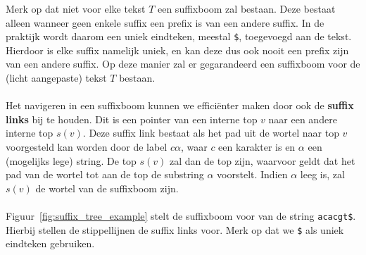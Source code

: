 Merk op dat niet voor elke tekst $T$ een suffixboom zal bestaan.
Deze bestaat alleen wanneer geen enkele suffix een prefix is van een andere suffix.
In de praktijk wordt daarom een uniek eindteken, meestal \texttt{\$}, toegevoegd aan de tekst.
Hierdoor is elke suffix namelijk uniek, en kan deze dus ook nooit een prefix zijn van een andere suffix.
Op deze manier zal er gegarandeerd een suffixboom voor de (licht aangepaste) tekst $T$ bestaan.
\\ \\
Het navigeren in een suffixboom kunnen we efficiënter maken door ook de \textbf{suffix links} bij te houden.
Dit is een pointer van een interne top $v$ naar een andere interne top $s(v)$.
Deze suffix link bestaat als het pad uit de wortel naar top $v$ voorgesteld kan worden door de label $c\alpha$, waar $c$ een karakter is en $\alpha$ een (mogelijks lege) string.
De top $s(v)$ zal dan de top zijn, waarvoor geldt dat het pad van de wortel tot aan de top de substring $\alpha$ voorstelt.
Indien $\alpha$ leeg is, zal $s(v)$ de wortel van de suffixboom zijn.
\\ \\
Figuur~\ref{fig:suffix_tree_example} stelt de suffixboom voor van de string \texttt{acacgt\$}.
Hierbij stellen de stippellijnen de suffix links voor.
Merk op dat we \texttt{\$} als uniek eindteken gebruiken.

